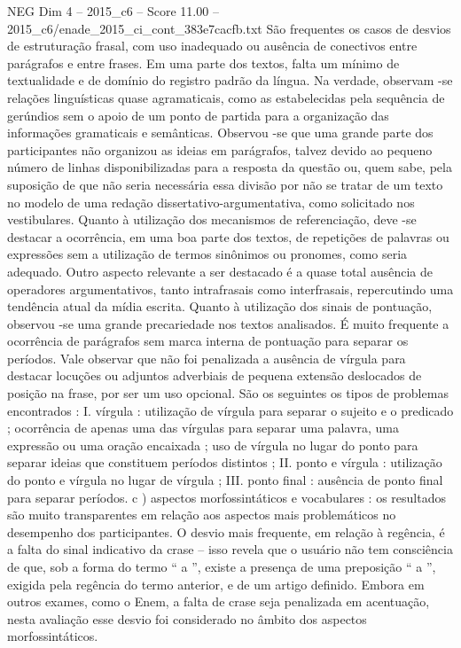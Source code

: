 \begin{textsample}{NEG Dim 4 – 2015\_c6 – Score 11.00 – 2015\_c6/enade\_2015\_ci\_cont\_383e7cacfb.txt}
São frequentes os casos de desvios de estruturação frasal, com uso inadequado ou ausência de conectivos entre parágrafos e entre frases.
Em uma parte dos textos, falta um mínimo de textualidade e de domínio do registro padrão da língua.
Na verdade, observam -se relações linguísticas quase agramaticais, como as estabelecidas pela sequência de gerúndios sem o apoio de um ponto de partida para a organização das informações gramaticais e semânticas.
Observou -se que uma grande parte dos participantes não organizou as ideias em parágrafos, talvez devido ao pequeno número de linhas disponibilizadas para a resposta da questão ou, quem sabe, pela suposição de que não seria necessária essa divisão por não se tratar de um texto no modelo de uma redação dissertativo-argumentativa, como solicitado nos vestibulares.
Quanto à utilização dos mecanismos de referenciação, deve -se destacar a ocorrência, em uma boa parte dos textos, de repetições de palavras ou expressões sem a utilização de termos sinônimos ou pronomes, como seria adequado.
Outro aspecto relevante a ser destacado é a quase total ausência de operadores argumentativos, tanto intrafrasais como interfrasais, repercutindo uma tendência atual da mídia escrita.
Quanto à utilização dos sinais de pontuação, observou -se uma grande precariedade nos textos analisados.
É muito frequente a ocorrência de parágrafos sem marca interna de pontuação para separar os períodos.
Vale observar que não foi penalizada a ausência de vírgula para destacar locuções ou adjuntos adverbiais de pequena extensão deslocados de posição na frase, por ser um uso opcional.
São os seguintes os tipos de problemas encontrados : I. vírgula : utilização de vírgula para separar o sujeito e o predicado ; ocorrência de apenas uma das vírgulas para separar uma palavra, uma expressão ou uma oração encaixada ; uso de vírgula no lugar do ponto para separar ideias que constituem períodos distintos ; II. ponto e vírgula : utilização do ponto e vírgula no lugar de vírgula ; III. ponto final : ausência de ponto final para separar períodos. c ) aspectos morfossintáticos e vocabulares : os resultados são muito transparentes em relação aos aspectos mais problemáticos no desempenho dos participantes.
O desvio mais frequente, em relação à regência, é a falta do sinal indicativo da crase – isso revela que o usuário não tem consciência de que, sob a forma do termo “ a ”, existe a presença de uma preposição “ a ”, exigida pela regência do termo anterior, e de um artigo definido.
Embora em outros exames, como o Enem, a falta de crase seja penalizada em acentuação, nesta avaliação esse desvio foi considerado no âmbito dos aspectos morfossintáticos.

\end{textsample}
